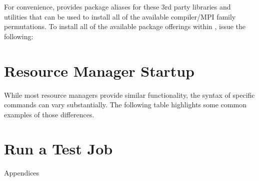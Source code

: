 \documentclass[letterpaper]{article}
\begin{document}
For convenience, \OHPC{} provides package aliases for these 3rd
party libraries and utilities that can be used to install all of the available
compiler/MPI family permutations. To install all of the available package
offerings within \OHPC{}, issue the following:




\vspace*{0.2cm}

\section{Resource Manager Startup} \label{sec:rms_startup}


\begin{center}
\begin{tcolorbox}[]
\small
While most resource managers provide similar functionality, the syntax of
specific commands can vary substantially. The following table highlights some
common examples of those differences.
\vspace*{0.2cm}


\end{tcolorbox}
\end{center}


\clearpage
\section{Run a Test Job} \label{sec:test_job}


\clearpage
\appendix
{\bf \LARGE \centerline{Appendices}} \vspace*{0.2cm}

\renewcommand{\thesubsection}{\Alph{subsection}:}




\end{document}
